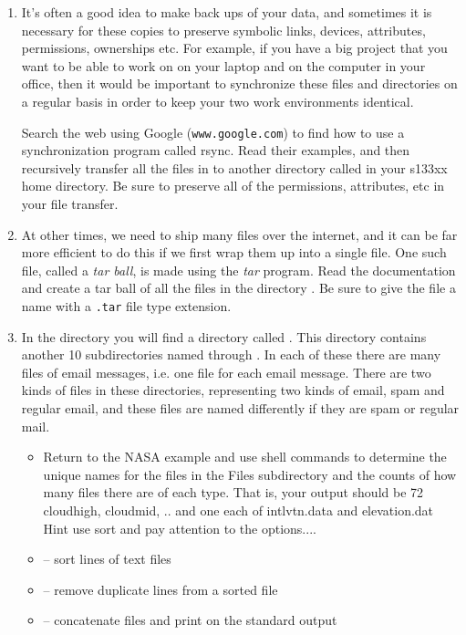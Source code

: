 \begin{enumerate}
\item It's often a  good idea to make back ups of your data,
and sometimes it is necessary for these copies to preserve symbolic
links,  devices, attributes, permissions, ownerships etc.
For example, if you have a big project that you want to be able to work on
on your laptop and on the computer in your office, then it would
be important to synchronize these files and directories on a
regular basis in order to keep your two work environments identical.

Search the web using Google (\texttt{www.google.com}) to find
how to use a synchronization program called rsync.
Read their examples, and then recursively transfer
all the files in  to another directory called
 in your s133xx home directory.
Be sure to preserve all of the permissions, attributes, etc
in your file transfer.

\item At other times, we need to ship many files over the internet,
and it can be far more efficient to do this if we first wrap them up
into a single file.
One such file, called a \textit{tar ball}, is made using the \textit{tar}
program.  Read the documentation and create a tar ball of all the
files in the directory .  Be sure to give the file a name
with a \texttt{.tar} file type extension.

\item In the directory 
you will find a directory called . This directory contains
another 10 subdirectories named  through .
In each of these there are many files of email messages,
i.e. one file for each email message.
There are two kinds of files in these directories, representing
two kinds of email, spam and regular email, and these files are
named differently if they are spam or regular mail.

\begin{itemize}
\item Return to the NASA example and use shell commands to determine
  the unique names for the files in the Files subdirectory and the
  counts of how many files there are of each type.  That is, your
  output should be 72 cloudhigh, cloudmid, .. and one each of
  intlvtn.data and elevation.dat  Hint use sort and pay attention to
  the options.... \item {} -- sort lines of text files
\item {} -- remove duplicate lines from a sorted file
\item {} -- concatenate files and print on the standard output


\end{itemize}
\end{enumerate}
